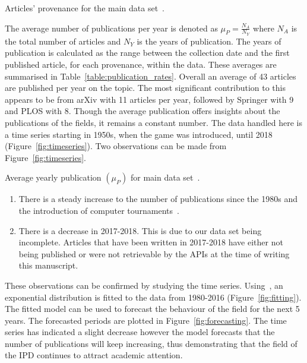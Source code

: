\documentclass{article}
\theoremstyle{definition}
\begin{document}
\begin{table}[!hbtp]
    \begin{center}
    \resizebox{.4\textwidth}{!}{
    }
    \end{center}
    \caption{Articles' provenance for the main data set~\cite{pd_data_2018}.}
    \label{table:provenance}
\end{table}

The average number of publications per year is denoted as \(\mu_P =
\frac{N_A}{N_Y}\) where \(N_A\) is the total number of articles and \(N_Y\) is
the years of publication. The years of publication is calculated as the range
between the collection date and the first published article, for each
provenance, within the data. These averages are summarised in
Table~\ref{table:publication_rates}. Overall an average of 43 articles are
published per year on the topic. The most significant contribution to this
appears to be from arXiv with 11 articles per year, followed by Springer with 9
and PLOS with 8.
Though the average publication offers insights about the publications of the
fields, it remains a constant number. The data handled here is a time
series starting in 1950s, when the game was introduced, until 2018 (Figure~\ref{fig:timeseries}). 
Two observations can be made from Figure~\ref{fig:timeseries}.

\begin{table}[!hbtp]
    \begin{center}
    \resizebox{.15\textwidth}{!}{
    }
    \end{center}
    \caption{Average yearly publication $(\mu_P)$ for main data set~\cite{pd_data_2018}.}
    \label{table:publication_rates}
\end{table}

\begin{enumerate}
    \item There is a steady increase to the number of publications since the
    1980s and the introduction of computer tournaments~\cite{Axelrod1981}.
    \item There is a decrease in 2017-2018. This is due to our data set being
    incomplete. Articles that have been written in 2017-2018 have either not
    being published or were not retrievable by the APIs at the time of writing
    this manuscript.
\end{enumerate}

These observations can be confirmed by studying the time series.
Using~\cite{scipy}, an exponential distribution is fitted to the data from
1980-2016 (Figure~\ref{fig:fitting}).
The fitted model can be used to forecast the behaviour of the field for the
next 5 years. The forecasted periods are plotted in
Figure~\ref{fig:forecasting}. The time series has indicated a slight decrease
however the model forecasts that the number of publications will keep
increasing, thus demonstrating that the field of the IPD
continues to attract academic attention.
\end{document}
